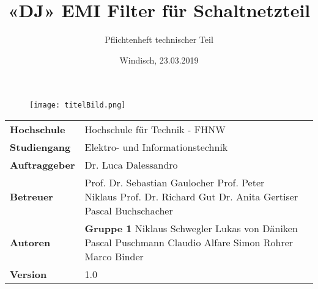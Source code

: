 \documentclass[final]{fhnwreport}       %
\title{«DJ» EMI Filter für Schaltnetzteil}          			%
\author{Pflichtenheft technischer Teil}  		%
\date{Windisch, 23.03.2019}             		%
\begin{document}
\maketitle

\vspace*{-1cm}						    %
\vfill
\begin{figure}[H]
\centering
\texttt{[image: titelBild.png]}
\end{figure}
\vfill

{
\renewcommand\arraystretch{2}
\begin{center}
\begin{tabular}{ >{\bf} l p{10cm} l }
Hochschule&Hochschule für Technik - FHNW\\
Studiengang&Elektro- und Informationstechnik\\
Auftraggeber&Dr. Luca Dalessandro\\
Betreuer&Prof. Dr. Sebastian Gaulocher \newline Prof. Peter Niklaus \newline Prof. Dr. Richard Gut \newline  Dr. Anita Gertiser \newline Pascal Buchschacher \\
Autoren&\textbf{Gruppe 1} \newline Niklaus Schwegler \newline Lukas von Däniken \newline Pascal Puschmann \newline Claudio Alfare  \newline Simon Rohrer \newline Marco Binder\\
Version&1.0 %
\end{tabular}
\end{center}
}

\clearpage

\thispagestyle{empty}
			
\tableofcontents
\clearpage


\end{document}
